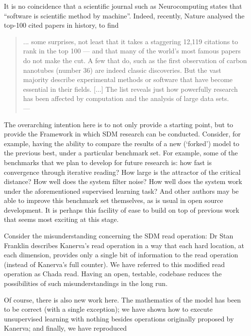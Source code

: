 It is no coincidence that a scientific journal such as Neurocomputing states that “software is scientific method by machine”.  Indeed, recently, Nature analysed the top-100 cited papers in history, to find

\begin{quote}
... some surprises, not least that it takes a staggering 12,119 citations to rank in the top 100 — and that many of the world’s most famous papers do not make the cut. A few that do, such as the first observation of carbon nanotubes (number 36) are indeed classic discoveries. But the vast majority describe experimental methods or software that have become essential in their fields. [...] The list reveals just how powerfully research has been affected by computation and the analysis of large data sets. \\
\hfill --- \citet{van2014top}
\end{quote}


The overarching intention here is to not only provide a starting point, but to provide the Framework in which SDM research can be conducted.  Consider, for example, having the ability to compare the results of a new (‘forked’) model to the previous best, under a particular benchmark set.  For example, some of the benchmarks that we plan to develop for future research is: how fast is convergence through iterative reading?  How large is the attractor of the critical distance?  How well does the system filter noise?  How well does the system work under the aforementioned supervised learning task?  And other authors may be able to improve this benchmark set themselves, as is usual in open source development.  It is perhaps this facility of ease to build on top of previous work that seems most exciting at this stage.

Consider the misunderstanding concerning the SDM read operation:  Dr Stan Franklin describes Kanerva's read operation in a way that each hard location, at each dimension, provides only a single bit of information to the read operation (instead of Kanerva's full counter).  We have referred to this modified read operation as Chada read.  Having an open, testable, codebase reduces the possibilities of such misunderstandings in the long run.

Of course, there is also new work here.  The mathematics of the model has been to be correct (with a single exception); we have shown how to execute unsupervised learning with nothing besides operations originally proposed by Kanerva; and finally, we have reproduced


